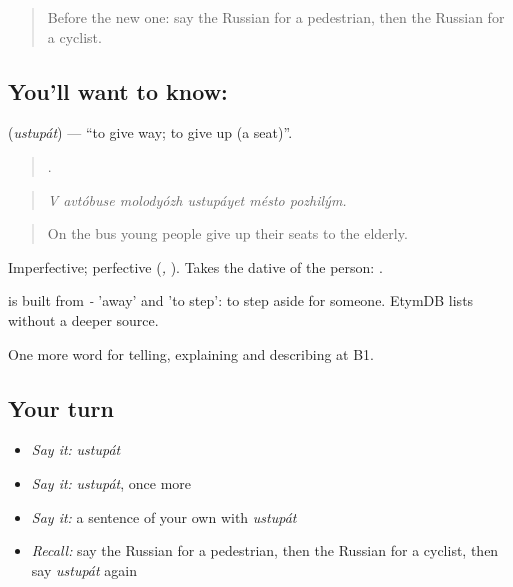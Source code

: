 \label{lesson:RU-C412-ustupat}



\begin{quote}
Before the new one: say the Russian for a pedestrian, then the Russian for a cyclist.
\end{quote}

\subsection*{You'll want to know: }
\textbf{} (\emph{ustupát}) — \textquotedblleft{}to give way; to give up (a seat)\textquotedblright{}.

\begin{quote}
     .
\end{quote}

\begin{quote}
\emph{V avtóbuse molodyózh ustupáyet mésto pozhilým.}
\end{quote}

\begin{quote}
On the bus young people give up their seats to the elderly.
\end{quote}

Imperfective; perfective \emph{} (\emph{, }). Takes the dative of the person: \emph{  }.

\begin{cousinweb}
\emph{} is built from \emph{-} 'away' and \emph{} 'to step': to step aside for someone. EtymDB lists \emph{} without a deeper source.
\end{cousinweb}

\begin{grammarlens}[title={What you've built}]
One more word for telling, explaining and describing at B1.
\end{grammarlens}

\subsection*{Your turn}
\begin{itemize}
\raggedright
  \item \emph{Say it:} \emph{ustupát}
  \item \emph{Say it:} \emph{ustupát}, once more
  \item \emph{Say it:} a sentence of your own with \emph{ustupát}
  \item \emph{Recall:} say the Russian for a pedestrian, then the Russian for a cyclist, then say \emph{ustupát} again
\end{itemize}

